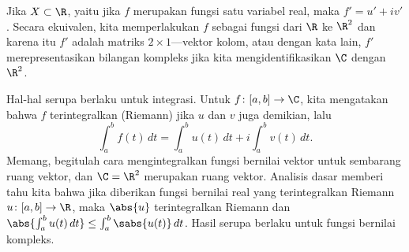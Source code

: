 
Jika $X \subset \R$, yaitu jika $f$ merupakan fungsi satu variabel real,
maka $f' = u' + iv'$.
Secara ekuivalen, kita memperlakukan $f$ sebagai fungsi dari $\R$ ke $\R^2$
dan karena itu $f'$ adalah matriks $2 \times 1$---vektor kolom, atau dengan
kata lain, $f'$ merepresentasikan bilangan kompleks jika kita
mengidentifikasikan $\C$ dengan $\R^2$.

Hal-hal serupa berlaku untuk integrasi.
Untuk $f \colon [a,b] \to \C$,
kita mengatakan bahwa $f$ terintegralkan (Riemann) jika $u$ dan $v$ juga
demikian, lalu
\begin{equation*}
\int_a^b f(t) \, dt = 
\int_a^b u(t) \, dt + i \int_a^b v(t) \, dt .
\end{equation*}
Memang, begitulah cara mengintegralkan fungsi bernilai vektor
untuk sembarang ruang vektor, dan $\C = \R^2$ merupakan ruang vektor.
Analisis dasar memberi tahu kita bahwa jika diberikan fungsi bernilai real
yang terintegralkan Riemann $u \colon [a,b] \to \R$,
maka $\abs{u}$ terintegralkan Riemann dan
$\abs{\int_a^b u(t) \, dt} \leq \int_a^b \sabs{u(t)} \, dt$.
Hasil serupa berlaku untuk fungsi bernilai kompleks.
